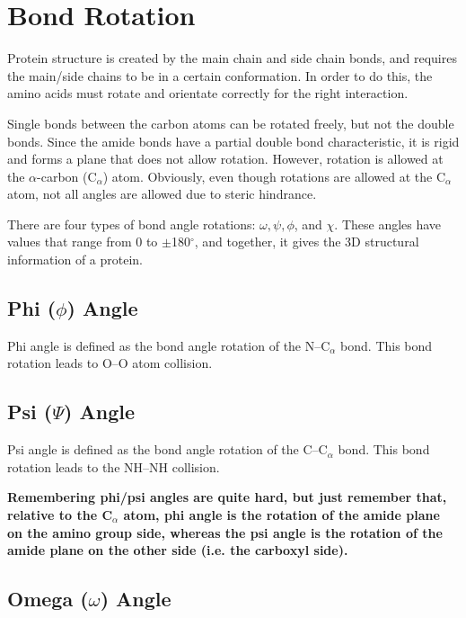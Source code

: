 \section{Bond Rotation}

Protein structure is created by the main chain and side chain bonds, and requires the main/side chains to be in a certain conformation.
In order to do this, the amino acids must rotate and orientate correctly for the right interaction.

Single bonds between the carbon atoms can be rotated freely, but not the double bonds.
Since the amide bonds have a partial double bond characteristic, it is rigid and forms a plane that does not allow rotation.
However, rotation is allowed at the $\alpha$-carbon (C$_{\alpha}$) atom.
Obviously, even though rotations are allowed at the C$_{\alpha}$ atom, not all angles are allowed due to steric hindrance.

There are four types of bond angle rotations: $\omega, \psi, \phi$, and $\chi$.
These angles have values that range from 0 to $\pm$180$^{\circ}$, and together, it gives the 3D structural information of a protein.

\subsection{Phi ($\phi$) Angle}

Phi angle is defined as the bond angle rotation of the N--C$_{\alpha}$ bond.
This bond rotation leads to O--O atom collision.

\subsection{Psi ($\Psi$) Angle}

Psi angle is defined as the bond angle rotation of the C--C$_{\alpha}$ bond.
This bond rotation leads to the NH--NH collision.

\vspace{1.0cm}

\noindent
\textbf{Remembering phi/psi angles are quite hard, but just remember that, relative to the C$_{\alpha}$ atom, phi angle is the rotation of the amide plane on the amino group side, whereas the psi angle is the rotation of the amide plane on the other side (i.e. the carboxyl side).}

\subsection{Omega ($\omega$) Angle}

